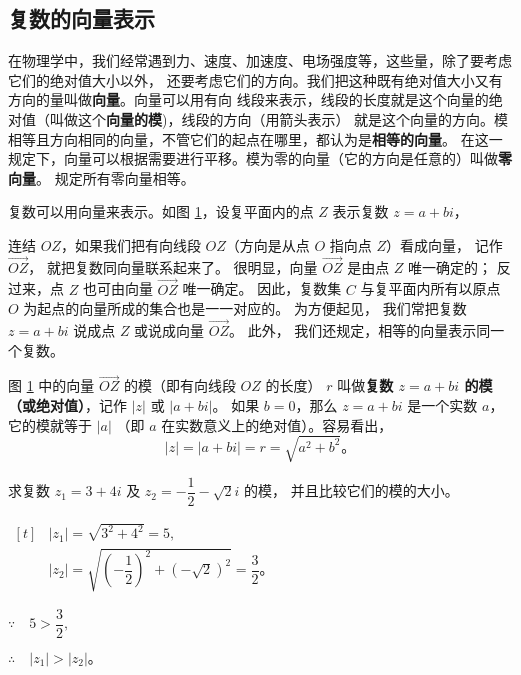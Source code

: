 \subsection{复数的向量表示}\label{subsec:5-3}

在物理学中，我们经常遇到力、速度、加速度、电场强度等，这些量，除了要考虑它们的绝对值大小以外，
还要考虑它们的方向。我们把这种既有绝对值大小又有方向的量叫做\textbf{向量}。向量可以用有向
线段来表示，线段的长度就是这个向量的绝对值（叫做这个\textbf{向量的模})，线段的方向（用箭头表示）
就是这个向量的方向。模相等且方向相同的向量，不管它们的起点在哪里，都认为是\textbf{相等的向量}。
在这一规定下，向量可以根据需要进行平移。模为零的向量（它的方向是任意的）叫做\textbf{零向量}。
规定所有零向量相等。

复数可以用向量来表示。如图 \ref{fig:5-3}，设复平面内的点 $Z$ 表示复数 $z = a + bi$，
\begin{figure}[htbp]
    \centering
    
    \caption{}\label{fig:5-3}
\end{figure}
连结 $OZ$，如果我们把有向线段 $OZ$（方向是从点 $O$ 指向点 $Z$）看成向量，
记作 $\overrightarrow{OZ}$， 就把复数同向量联系起来了。
很明显，向量 $\overrightarrow{OZ}$ 是由点 $Z$ 唯一确定的；
反过来，点 $Z$ 也可由向量 $\overrightarrow{OZ}$ 唯一确定。
因此，复数集 $C$ 与复平面内所有以原点 $O$ 为起点的向量所成的集合也是一一对应的。
为方便起见， 我们常把复数 $z = a + bi$ 说成点 $Z$ 或说成向量 $\overrightarrow{OZ}$。
此外， 我们还规定，相等的向量表示同一个复数。


图 \ref{fig:5-3} 中的向量 $\overrightarrow{OZ}$ 的模（即有向线段 $OZ$ 的长度）
$r$ 叫做\textbf{复数 $z = a + bi$ 的模（或绝对值）}，记作 $|z|$ 或 $|a + bi|$。
如果 $b = 0$，那么 $z = a + bi$ 是一个实数 $a$，它的模就等于 $|a|$
（即 $a$ 在实数意义上的绝对值）。容易看出，
$$ |z| = |a + bi| = r = \sqrt{a^2 + b^2} \text{。}$$

\liti 求复数 $z_1 = 3 + 4i$ 及 $z_2 = -\dfrac{1}{2} - \sqrt{2}i$ 的模，
并且比较它们的模的大小。

\jie $\begin{aligned}[t]
    &|z_1| = \sqrt{3^2 + 4^2} = 5, \\
    &|z_2| = \sqrt{\left( -\dfrac{1}{2} \right)^2 + \left( -\sqrt{2} \right)^2} = \dfrac{3}{2} \text{。}
\end{aligned}$

$\because \quad 5 > \dfrac{3}{2},$

$\therefore \quad |z_1| > |z_2| \text{。}$



